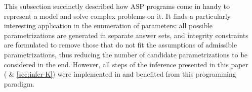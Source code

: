 \begin{example}
\end{example}



\medskip

This subsection succinctly described how ASP programs come in handy to represent a model and solve complex problems on it.
It finds a particularly interesting application in the enumeration of parameters:
all possible parametrizations are generated in separate answer sets,
and integrity constraints are formulated to remove those that do not fit the assumptions of admissible parametrizations,
thus reducing the number of candidate parametrizations to be considered in the end.
However, all steps of the inference presented in this paper ( \& \ref{sec:infer-K})
were implemented in and benefited from this programming paradigm.
